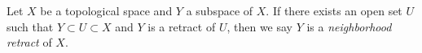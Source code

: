 \documentclass[12pt]{article}
\begin{document}
Let $X$ be a topological space and $Y$ a subspace of $X$.  If there exists an open set $U$ such that $Y \subset U \subset X$ and $Y$ is a retract of $U$, then we say $Y$ is a \emph{neighborhood retract} of $X$.
\end{document}
